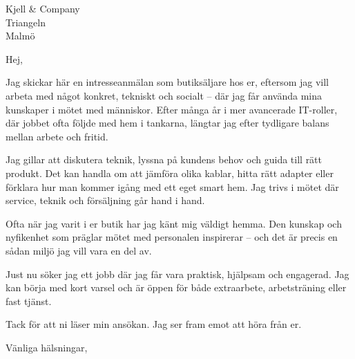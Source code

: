 \documentclass[a4paper]{scrlttr2}
\begin{document}
\begin{letter}{Kjell \& Company\\Triangeln\\Malmö}

\opening{Hej,}

Jag skickar här en intresseanmälan som butiksäljare hos er, eftersom jag vill arbeta med något konkret, tekniskt och socialt – där jag får använda mina kunskaper i mötet med människor. Efter många år i mer avancerade IT-roller, där jobbet ofta följde med hem i tankarna, längtar jag efter tydligare balans mellan arbete och fritid.

Jag gillar att diskutera teknik, lyssna på kundens behov och guida till rätt produkt. Det kan handla om att jämföra olika kablar, hitta rätt adapter eller förklara hur man kommer igång med ett eget smart hem. Jag trivs i mötet där service, teknik och försäljning går hand i hand.

Ofta när jag varit i er butik har jag känt mig väldigt hemma. Den kunskap och nyfikenhet som präglar mötet med personalen inspirerar – och det är precis en sådan miljö jag vill vara en del av.

Just nu söker jag ett jobb där jag får vara praktisk, hjälpsam och engagerad. Jag kan börja med kort varsel och är öppen för både extraarbete, arbetsträning eller fast tjänst.

Tack för att ni läser min ansökan. Jag ser fram emot att höra från er.

\closing{Vänliga hälsningar,}

\end{letter}
\end{document}
